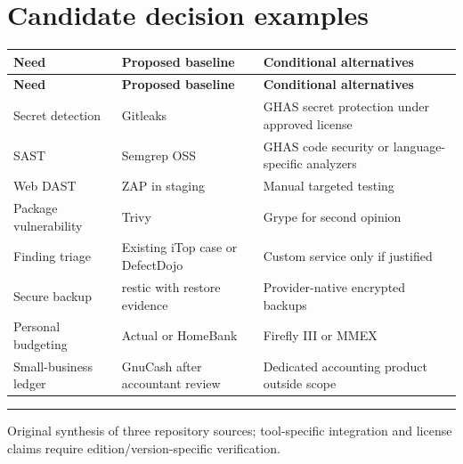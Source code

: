 \documentclass[10pt,letterpaper]{article}
\begin{document}
\section{Candidate decision examples}
\small\begin{longtable}{>{\raggedright\arraybackslash}p{}>{\raggedright\arraybackslash}p{}>{\raggedright\arraybackslash}p{}}
\toprule
\textbf{Need} & \textbf{Proposed baseline} & \textbf{Conditional alternatives}\\
\midrule\endfirsthead
\toprule
\textbf{Need} & \textbf{Proposed baseline} & \textbf{Conditional alternatives}\\
\midrule\endhead
Secret detection & Gitleaks & GHAS secret protection under approved license\\
SAST & Semgrep OSS & GHAS code security or language-specific analyzers\\
Web DAST & ZAP in staging & Manual targeted testing\\
Package vulnerability & Trivy & Grype for second opinion\\
Finding triage & Existing iTop case or DefectDojo & Custom service only if justified\\
Secure backup & restic with restore evidence & Provider-native encrypted backups\\
Personal budgeting & Actual or HomeBank & Firefly III or MMEX\\
Small-business ledger & GnuCash after accountant review & Dedicated accounting product outside scope\\
\bottomrule
\end{longtable}
\normalsize
\vfill\noindent\color{muted}\rule{\linewidth}{0.4pt}\par\scriptsize Original synthesis of three repository sources; tool-specific integration and license claims require edition/version-specific verification.\normalsize
\end{document}
